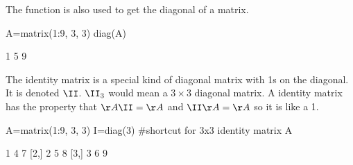 The \verb@diag@ function is also used to get the diagonal of a matrix.
\begin{Schunk}
\begin{Sinput}
 A=matrix(1:9, 3, 3)
 diag(A)
\end{Sinput}
\begin{Soutput}
[1] 1 5 9
\end{Soutput}
\end{Schunk}
The identity matrix is a special kind of diagonal matrix with 1s on the diagonal.  It is denoted $\II$.  $\II_3$ would mean a $3 \times 3$ diagonal matrix.  A identity matrix has the property that $\AA\II=\AA$ and $\II\AA=\AA$ so it is like a 1.
\begin{Schunk}
\begin{Sinput}
 A=matrix(1:9, 3, 3)
 I=diag(3) #shortcut for 3x3 identity matrix
 A%*%I
\end{Sinput}
\begin{Soutput}
     [,1] [,2] [,3]
[1,]    1    4    7
[2,]    2    5    8
[3,]    3    6    9
\end{Soutput}
\end{Schunk}

